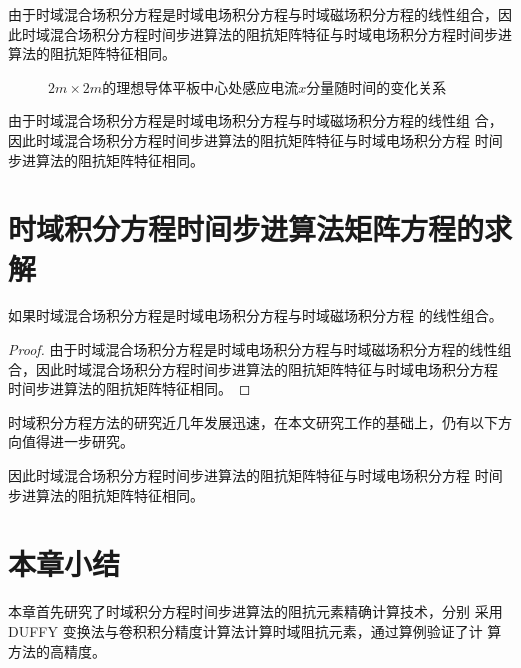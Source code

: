 由于时域混合场积分方程是时域电场积分方程与时域磁场积分方程的线性组合，因此时域混合场积分方程时间步进算法的阻抗矩阵特征与时域电场积分方程时间步进算法的阻抗矩阵特征相同。

\begin{figure}[h]
	\caption{$2m\times 2m$的理想导体平板中心处感应电流$x$分量随时间的变化关系}
	\label{fig2}
\end{figure}


由于时域混合场积分方程是时域电场积分方程与时域磁场积分方程的线性组
合，因此时域混合场积分方程时间步进算法的阻抗矩阵特征与时域电场积分方程
时间步进算法的阻抗矩阵特征相同。
\section{时域积分方程时间步进算法矩阵方程的求解}

\begin{theorem}
	如果时域混合场积分方程是时域电场积分方程与时域磁场积分方程
	的线性组合。
\end{theorem}
\begin{proof}
	由于时域混合场积分方程是时域电场积分方程与时域磁场积分方程的线性组
	合，因此时域混合场积分方程时间步进算法的阻抗矩阵特征与时域电场积分方程
	时间步进算法的阻抗矩阵特征相同。
\end{proof}
\begin{corollary}
	时域积分方程方法的研究近几年发展迅速，在本文研究工作的基础上，仍有以下方向值得进一步研究。
\end{corollary}
\begin{lemma}
	因此时域混合场积分方程时间步进算法的阻抗矩阵特征与时域电场积分方程
	时间步进算法的阻抗矩阵特征相同。
\end{lemma}

\section{本章小结}
本章首先研究了时域积分方程时间步进算法的阻抗元素精确计算技术，分别
采用DUFFY 变换法与卷积积分精度计算法计算时域阻抗元素，通过算例验证了计
算方法的高精度。
